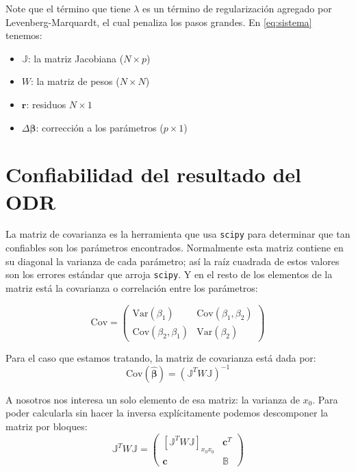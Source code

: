 Note que el término que tiene $\lambda$ es un término de regularización agregado por Levenberg-Marquardt, el cual penaliza los pasos grandes. En \eqref{eq:sistema} tenemos:
\begin{itemize}
    \item $\mathbb{J}$: la matriz Jacobiana ($N \times p$)
    \item $W$: la matriz de pesos ($N \times N$)
    \item $\mathbf{r}$: residuos $N \times 1$
    \item $\Delta\boldsymbol{\beta}$: corrección a los parámetros ($p \times 1$)
\end{itemize}

\section{Confiabilidad del resultado del ODR}

La matriz de covarianza es la herramienta que usa \texttt{scipy} para determinar que tan confiables son los parámetros encontrados. Normalmente esta matriz contiene en su diagonal la varianza de cada parámetro; así la raíz cuadrada de estos valores son los errores estándar que arroja \texttt{scipy}. Y en el resto de los elementos de la matriz está la covarianza o correlación entre los parámetros:

\begin{equation}
    \mathrm{Cov} = \begin{pmatrix} \mathrm{Var}(\beta_1) & \mathrm{Cov}(\beta_1,\beta_2) \\ \mathrm{Cov}(\beta_2,\beta_1) & \mathrm{Var}(\beta_2) \end{pmatrix}
\end{equation}

Para el caso que estamos tratando, la matriz de covarianza está dada por:
\begin{equation}
    \mathrm{Cov}(\hat{\boldsymbol{\beta}}) = \left(\mathbb{J}^T W \mathbb{J}\right)^{-1} \label{eq:cov}
\end{equation}

A nosotros nos interesa un solo elemento de esa matriz: la varianza de $x_0$. Para poder calcularla sin hacer la inversa explícitamente podemos descomponer la matriz por bloques:
\begin{equation}
    \mathbb{J}^T W \mathbb{J} = \begin{pmatrix} \left[\mathbb{J}^T W \mathbb{J}\right]_{x_0 x_0} & \mathbf{c}^T \\ \mathbf{c} & \mathbb{B} \end{pmatrix} \label{eq:bloques}
\end{equation}

